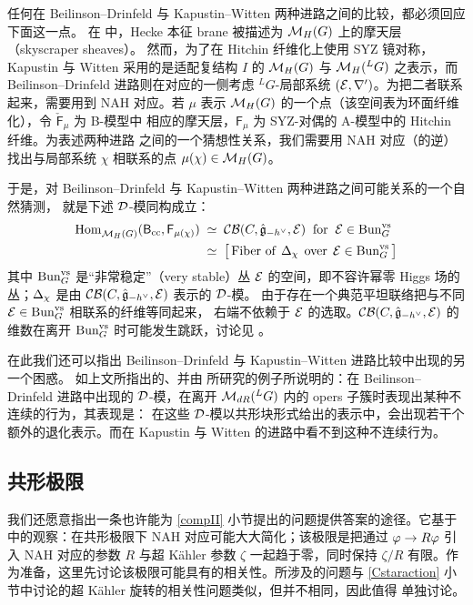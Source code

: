 任何在 Beilinson--Drinfeld 与 Kapustin--Witten 两种进路之间的比较，都必须回应下面这一点。
在 \cite{KW} 中，Hecke 本征 brane 被描述为 $\mathcal{M}_H(G)$ 上的摩天层（skyscraper sheaves）。
然而，为了在 Hitchin 纤维化上使用 SYZ 镜对称，Kapustin 与 Witten 采用的是适配复结构 $I$ 的
$\mathcal{M}_H(G)$ 与 $\mathcal{M}_H({}^L G)$ 之表示，而 Beilinson--Drinfeld 进路则在对应的一侧考虑
${}^LG$-局部系统 $(\mathcal{E},\nabla')$。为把二者联系起来，需要用到 NAH 对应。若 $\mu$ 表示
$\mathcal{M}_H(G)$ 的一个点（该空间表为环面纤维化），令 $\check{\mathsf{F}}_{\mu}$ 为 B-模型中
相应的摩天层，$\mathsf{F}_{\mu}$ 为 SYZ-对偶的 A-模型中的 Hitchin 纤维。为表述两种进路
之间的一个猜想性关系，我们需要用 NAH 对应（的逆）找出与局部系统 $\chi$ 相联系的点
$\mu(\chi)\in\mathcal{M}_H(G)$。

于是，对 Beilinson--Drinfeld 与 Kapustin--Witten 两种进路之间可能关系的一个自然猜测，
就是下述 $\mathcal{D}$-模同构成立：
\begin{equation} \label{BD-KW}
\begin{aligned}
{\rm Hom}_{\mathcal{M}_H(G)}^{}(\mathsf{B}_{\rm cc},\mathsf{F}_{\mu(\chi)}) 
& \;\simeq\; \mathcal{CB}(C,\hat{\mathfrak{g}}_{-h^{\vee}},\mathcal{E})\;\;\text{for}\;\;\mathcal{E}\in\mathrm{Bun}_G^{\rm vs}\\
& \;\simeq\; \big[\,
\text{Fiber of}\;\, \Delta_\chi\;\,\text{over}\;\,\mathcal{E}\in\mathrm{Bun}_G^{\rm vs}\,\big]
\end{aligned}
\end{equation}
其中 $\mathrm{Bun}_G^{\rm vs}$ 是“非常稳定”（very stable）丛 $\mathcal{E}$ 的空间，即不容许幂零
Higgs 场的丛；$\Delta_\chi$ 是由 $\mathcal{CB}(C,\hat{\mathfrak{g}}_{-h^{\vee}},\mathcal{E})$ 表示的 $\mathcal{D}$-模。
由于存在一个典范平坦联络把与不同 $\mathcal{E}\in\mathrm{Bun}_G^{\rm vs}$ 相联系的纤维等同起来，
右端不依赖于 $\mathcal{E}$ 的选取。$\mathcal{CB}(C,\hat{\mathfrak{g}}_{-h^{\vee}},\mathcal{E})$ 的维数在离开
$\mathrm{Bun}_G^{\rm vs}$ 时可能发生跳跃，讨论见 \cite[Section 9.5]{Fr07}。

在此我们还可以指出 Beilinson--Drinfeld 与 Kapustin--Witten 进路比较中出现的另一个困惑。
如上文所指出的、并由 \cite{T10} 所研究的例子所说明的：在 Beilinson--Drinfeld 进路中出现的
$\mathcal{D}$-模，在离开 $\mathcal{M}_{dR}({}^LG)$ 内的 opers 子簇时表现出某种不连续的行为，其表现是：
在这些 $\mathcal{D}$-模以共形块形式给出的表示中，会出现若干个额外的退化表示。而在 Kapustin 与
Witten 的进路中看不到这种不连续行为。

\subsection{共形极限}

我们还愿意指出一条也许能为 \ref{compII} 小节提出的问题提供答案的途径。它基于
\cite{Ga14,DFKMMN} 中的观察：在共形极限下 NAH 对应可能大大简化；该极限是把通过
$\varphi\to R\varphi$ 引入 NAH 对应的参数 $R$ 与超 Kähler 参数 $\zeta$ 一起趋于零，同时保持
$\zeta/R$ 有限。作为准备，这里先讨论该极限可能具有的相关性。所涉及的问题与
\ref{Cstaraction} 小节中讨论的超 Kähler 旋转的相关性问题类似，但并不相同，因此值得
单独讨论。

